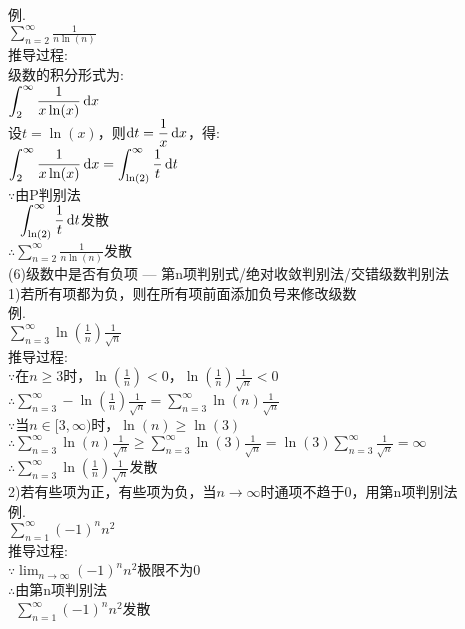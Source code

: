 例.\\
$\displaystyle\sum_{n=2}^{\infty}\frac{1}{n\ln(n)}$\\[1ex]
推导过程:\\
级数的积分形式为:\\
$\displaystyle\int_2^{\infty}\frac{1}{x\ln(x)}\mathop{}\!\mathrm{d} x$\\
设$t=\ln(x)$，则$\displaystyle\mathop{}\!\mathrm{d} t=\frac{1}{x}\mathop{}\!\mathrm{d} x$，得:\\
$\displaystyle\int_2^{\infty}\frac{1}{x\ln(x)}\mathop{}\!\mathrm{d} x=\int_{\ln(2)}^{\infty}\frac{1}{t}\mathop{}\!\mathrm{d} t$\\
$\because$由P判别法\\
$\phantom{\because}\displaystyle\int_{\ln(2)}^{\infty}\frac{1}{t}\mathop{}\!\mathrm{d} t$发散\\
$\therefore\displaystyle\sum_{n=2}^{\infty}\frac{1}{n\ln(n)}$发散\\[2ex]

(6)级数中是否有负项 --- 第n项判别式/绝对收敛判别法/交错级数判别法\\
1)若所有项都为负，则在所有项前面添加负号来修改级数\\
例.\\
$\displaystyle\sum_{n=3}^{\infty}\ln(\frac{1}{n})\frac{1}{\sqrt{n}}$\\[1ex]
推导过程:\\
$\because$在$n\geqslant 3$时，$\ln(\frac{1}{n})<0$，$\ln(\frac{1}{n})\frac{1}{\sqrt{n}}<0$\\
$\therefore\displaystyle\sum_{n=3}^{\infty}-\ln(\frac{1}{n})\frac{1}{\sqrt{n}}=\sum_{n=3}^{\infty}\ln(n)\frac{1}{\sqrt{n}}$\\
$\because$当$n\in[3,\infty)$时，$\ln(n)\geqslant\ln(3)$\\
$\therefore\displaystyle\sum_{n=3}^{\infty}\ln(n)\frac{1}{\sqrt{n}}\geqslant\sum_{n=3}^{\infty}\ln(3)\frac{1}{\sqrt{n}}=\ln(3)\sum_{n=3}^{\infty}\frac{1}{\sqrt{n}}=\infty$\\
$\therefore\displaystyle\sum_{n=3}^{\infty}\ln(\frac{1}{n})\frac{1}{\sqrt{n}}$发散\\[2ex]

2)若有些项为正，有些项为负，当$n\to\infty$时通项不趋于$0$，用第n项判别法\\
例.\\
$\displaystyle\sum_{n=1}^{\infty}(-1)^nn^2$\\[1ex]
推导过程:\\
$\because\displaystyle\lim_{n\to\infty}(-1)^nn^2$极限不为0\\
$\therefore$由第n项判别法\\
$\phantom{\therefore}\displaystyle\sum_{n=1}^{\infty}(-1)^nn^2$发散\\[2ex]

